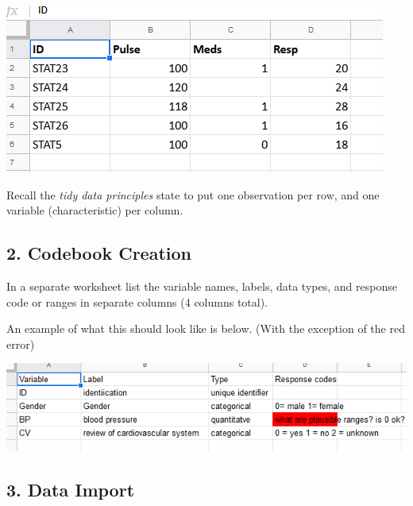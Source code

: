 \documentclass[
  letterpaper,
  DIV=11,
  numbers=noendperiod]{scrartcl}
\begin{document}
\includegraphics{images/hw1_data.png}

Recall the \emph{tidy data principles} state to put one observation per
row, and one variable (characteristic) per column.

\hypertarget{codebook-creation}{%
\subsection{2. Codebook Creation}\label{codebook-creation}}

In a separate worksheet list the variable names, labels, data types, and
response code or ranges in separate columns (4 columns total).

An example of what this should look like is below. (With the exception
of the red error)

\includegraphics{images/hw1_codebook.png}

\hypertarget{data-import}{%
\subsection{3. Data Import}\label{data-import}}
\end{document}
